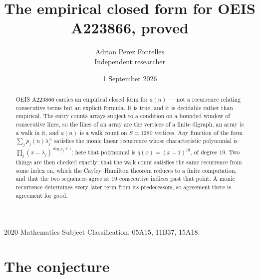 \documentclass[11pt,a4paper]{article}
\title{The empirical closed form for OEIS A223866, proved}
\author{Adrian Perez Fontelles\\ \small Independent researcher}
\date{1 September 2026}
\theoremstyle{plain}
\theoremstyle{definition}
\begin{document}
\maketitle

\begin{abstract}
OEIS A223866 carries an empirical closed form for $a(n)$ --- not a recurrence relating
consecutive terms but an explicit formula. It is true, and it is decidable rather than
empirical. The entry counts arrays subject to a condition on a bounded window of consecutive lines, so the lines of an array are the
vertices of a finite digraph, an array is a walk in it, and $a(n)$ is a walk count on
$S=1280$ vertices. Any function of the form $\sum_j p_j(n)\lambda_j^{\,n}$ satisfies the
monic linear recurrence whose characteristic polynomial is
$\prod_j(x-\lambda_j)^{\deg p_j+1}$; here that polynomial is $q(x)=(x-1)^{19}$, of degree
$19$. Two things are then checked exactly: that the walk count satisfies the same
recurrence from some index on, which the Cayley--Hamilton theorem reduces to a finite
computation, and that the two sequences agree at $19$ consecutive indices past that
point. A monic recurrence determines every later term from its predecessors, so agreement
there is agreement for good.
\end{abstract}

\noindent\small 2020 Mathematics Subject Classification. 05A15, 11B37, 15A18.\normalsize

\section{The conjecture}
\end{document}
